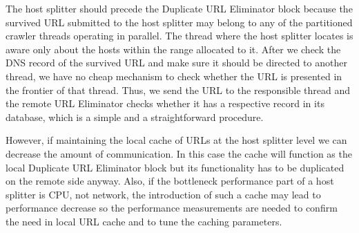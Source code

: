 \documentclass[a4paper, notitlepage]{article}
\begin{document}
The host splitter should precede the Duplicate URL Eliminator block because the survived URL submitted to the host splitter may belong to any of the partitioned crawler threads operating in parallel. The thread where the host splitter locates is aware only about the hosts within the range allocated to it. After we check the DNS record of the survived URL and make sure it should be directed to another thread, we have no cheap mechanism to check whether the URL is presented in the frontier of that thread. Thus, we send the URL to the responsible thread and the remote URL Eliminator checks whether it has a respective record in its database, which is a simple and a straightforward procedure.

However, if maintaining the local cache of URLs at the host splitter level we can decrease the amount of communication. In this case the cache will function as the local Duplicate URL Eliminator block but its functionality has to be duplicated on the remote side anyway. Also, if the bottleneck performance part of a host splitter is CPU, not network, the introduction of such a cache may lead to performance decrease so the performance measurements are needed to confirm the need in local URL cache and to tune the caching parameters.
\end{document}
